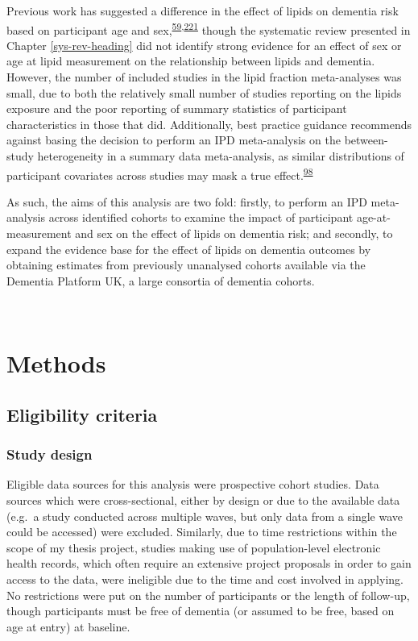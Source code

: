 \documentclass[a4paper, twoside]{templates/ociamthesis}
\begin{document}
Previous work has suggested a difference in the effect of lipids on dementia risk based on participant age and sex,\textsuperscript{\protect\hyperlink{ref-mielke2010}{59},\protect\hyperlink{ref-ancelin2013}{221}} though the systematic review presented in Chapter \ref{sys-rev-heading} did not identify strong evidence for an effect of sex or age at lipid measurement on the relationship between lipids and dementia. However, the number of included studies in the lipid fraction meta-analyses was small, due to both the relatively small number of studies reporting on the lipids exposure and the poor reporting of summary statistics of participant characteristics in those that did. Additionally, best practice guidance recommends against basing the decision to perform an IPD meta-analysis on the between-study heterogeneity in a summary data meta-analysis, as similar distributions of participant covariates across studies may mask a true effect.\textsuperscript{\protect\hyperlink{ref-riley2020}{98}}

As such, the aims of this analysis are two fold: firstly, to perform an IPD meta-analysis across identified cohorts to examine the impact of participant age-at-measurement and sex on the effect of lipids on dementia risk; and secondly, to expand the evidence base for the effect of lipids on dementia outcomes by obtaining estimates from previously unanalysed cohorts available via the Dementia Platform UK, a large consortia of dementia cohorts.

~

\hypertarget{methods-2}{%
\section{Methods}\label{methods-2}}

\hypertarget{eligibility-criteria-1}{%
\subsection{Eligibility criteria}\label{eligibility-criteria-1}}

\hypertarget{study-design}{%
\subsubsection{Study design}\label{study-design}}

Eligible data sources for this analysis were prospective cohort studies. Data sources which were cross-sectional, either by design or due to the available data (e.g.~a study conducted across multiple waves, but only data from a single wave could be accessed) were excluded. Similarly, due to time restrictions within the scope of my thesis project, studies making use of population-level electronic health records, which often require an extensive project proposals in order to gain access to the data, were ineligible due to the time and cost involved in applying. No restrictions were put on the number of participants or the length of follow-up, though participants must be free of dementia (or assumed to be free, based on age at entry) at baseline.
\end{document}
